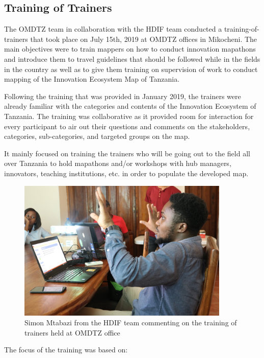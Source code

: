 \documentclass[a4paper,12pt,twoside]{article}
\begin{document}
\subsection{Training of Trainers}
The OMDTZ team in collaboration with the HDIF team conducted a training-of-trainers that took place on July 15th, 2019 at OMDTZ offices in Mikocheni. The main objectives were to train mappers on how to conduct innovation mapathons and introduce them to travel guidelines that should be followed while in the fields in the country as well as to give them training on supervision of work to conduct mapping of the Innovation Ecosystem Map of Tanzania.

Following the training that was provided in January 2019, the trainers were already familiar with the categories and contents of the Innovation Ecosystem of Tanzania. The training was collaborative as it provided room for interaction for every participant to air out their questions and comments on the stakeholders, categories, sub-categories, and targeted groups on the map.  

It mainly focused on training the trainers who will be going out to the field all over Tanzania to hold mapathons and/or workshops with hub managers, innovators, teaching institutions, etc. in order to populate the developed map.

\begin{figure}[H] %
	\centering
	\includegraphics[width=0.9\textwidth]{images/Simon_training.JPG}
	\caption{Simon Mtabazi from the HDIF team commenting on the training of trainers held at OMDTZ office}
\end{figure}

The focus of the training was based on:
\end{document}
